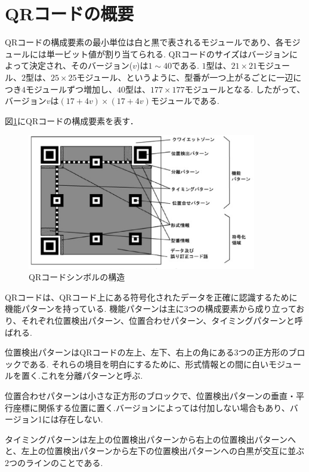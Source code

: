 \documentclass{thesis}
\begin{document}
\section{QRコードの概要}

QRコードの構成要素の最小単位は白と黒で表されるモジュールであり、各モジュールには単一ビット値が割り当てられる.
QRコードのサイズはバージョンによって決定され、そのバージョン($v$)は$1\sim40$である.
$1$型は、$21\times21$モジュール、$2$型は、$25\times25$モジュール、というように、型番が一つ上がるごとに一辺につき$4$モジュールずつ増加し、$40$型は、$177\times177$モジュールとなる.
したがって、バージョン$v$は$(17+4v)\times(17+4v)$モジュールである.

図\ref{fig:qrcode_config}にQRコードの構成要素を表す． \\

\begin{figure}[H]
\centering
\includegraphics[width=10cm,clip]{pic/qrcode_config.eps}
\caption{QRコードシンボルの構造\cite{jis}}
\label{fig:qrcode_config}
\end{figure}

QRコードは、QRコード上にある符号化されたデータを正確に認識するために機能パターンを持っている.
機能パターンは主に3つの構成要素から成り立っており、それぞれ位置検出パターン、位置合わせパターン、タイミングパターンと呼ばれる.

位置検出パターンはQRコードの左上、左下、右上の角にある3つの正方形のブロックである.
それらの境目を明白にするために、形式情報との間に白いモジュールを置く.これを分離パターンと呼ぶ.

位置合わせパターンは小さな正方形のブロックで、位置検出パターンの垂直・平行座標に関係する位置に置く.バージョンによっては付加しない場合もあり、バージョン1には存在しない.

タイミングパターンは左上の位置検出パターンから右上の位置検出パターンへと、左上の位置検出パターンから左下の位置検出パターンへの白黒が交互に並ぶ$2$つのラインのことである.
\end{document}
